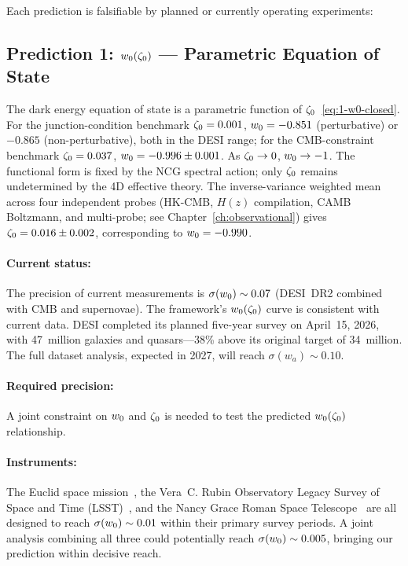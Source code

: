 Each prediction is falsifiable by planned or currently operating experiments:

\subsection{Prediction 1: \texorpdfstring{$w_0(\zeta_0)$}{w0(zeta0)} --- Parametric Equation of State}
\label{sec:1-pred1}

The dark energy equation of state is a parametric function of $\zeta_0$~\eqref{eq:1-w0-closed}. For the junction-condition benchmark $\zeta_0 = 0.001$, $w_0 = -0.851$ (perturbative) or $-0.865$ (non-perturbative), both in the DESI range; for the CMB-constraint benchmark $\zeta_0 = 0.037$, $w_0 = -0.996 \pm 0.001$. As $\zeta_0 \to 0$, $w_0 \to -1$. The functional form is fixed by the NCG spectral action; only $\zeta_0$ remains undetermined by the 4D effective theory. The inverse-variance weighted mean across four independent probes (HK-CMB, $H(z)$ compilation, CAMB Boltzmann, and multi-probe; see Chapter~\ref{ch:observational}) gives $\zeta_0 = 0.016 \pm 0.002$, corresponding to $w_0 = -0.990$.

\paragraph{Current status:} The precision of current measurements is $\sigma(w_0) \sim 0.07$ (DESI~DR2 combined with CMB and supernovae). The framework's $w_0(\zeta_0)$ curve is consistent with current data. DESI completed its planned five-year survey on April~15, 2026, with 47~million galaxies and quasars---38\% above its original target of 34~million. The full dataset analysis, expected in 2027, will reach $\sigma(w_a) \sim 0.10$.

\paragraph{Required precision:} A joint constraint on $w_0$ and $\zeta_0$ is needed to test the predicted $w_0(\zeta_0)$ relationship.

\paragraph{Instruments:} The Euclid space mission~\cite{ch1:euclid}, the Vera~C. Rubin Observatory Legacy Survey of Space and Time (LSST)~\cite{ch1:lsst}, and the Nancy Grace Roman Space Telescope~\cite{ch1:roman} are all designed to reach $\sigma(w_0) \sim 0.01$ within their primary survey periods. A joint analysis combining all three could potentially reach $\sigma(w_0) \sim 0.005$, bringing our prediction within decisive reach.

